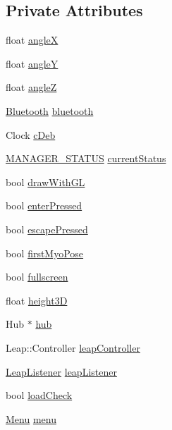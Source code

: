 \subsection*{Private Attributes}
\begin{DoxyCompactItemize}
\item 
float \hyperlink{classManager_ac0797572bb4f1bccef22e3d5d09a7bb5}{angleX}
\item 
float \hyperlink{classManager_a4477aa8adddce16ff4cfb67b4c989ffe}{angleY}
\item 
float \hyperlink{classManager_ae82e575227f9f2fa73492d189fc3f1f0}{angleZ}
\item 
\hyperlink{classBluetooth}{Bluetooth} \hyperlink{classManager_a8ea668a9304bd75db548cb554e1938a0}{bluetooth}
\item 
Clock \hyperlink{classManager_a5a0b1978a70cd9f61dc0992f8d0ff1a7}{c\+Deb}
\item 
\hyperlink{Global_8h_a94049c48a0d77b80bca0fcb5b1281516}{M\+A\+N\+A\+G\+E\+R\+\_\+\+S\+T\+A\+T\+US} \hyperlink{classManager_a85a5040629f23c6cb6d722ff8b82d7d8}{current\+Status}
\item 
bool \hyperlink{classManager_a578fc01b433137173003b232fd5d8b5c}{draw\+With\+GL}
\item 
bool \hyperlink{classManager_a0f72e89b86fbe7d83006e33f3bf65af6}{enter\+Pressed}
\item 
bool \hyperlink{classManager_aa4d6ae86cd8a720763c6a65ec11ee4b2}{escape\+Pressed}
\item 
bool \hyperlink{classManager_a8244d18155248161add39e851a749009}{first\+Myo\+Pose}
\item 
bool \hyperlink{classManager_aa5b7a47a6fbe9ceeb794becfe4b5f783}{fullscreen}
\item 
float \hyperlink{classManager_a993a1557e2721396eec0c996875e7d7a}{height3D}
\item 
Hub $\ast$ \hyperlink{classManager_aa5b648bc7e8a1f5a667b7eaf3aa08152}{hub}
\item 
Leap\+::\+Controller \hyperlink{classManager_a98fbc2dcc62ae1c3f576cb85d5e331f4}{leap\+Controller}
\item 
\hyperlink{classLeapListener}{Leap\+Listener} \hyperlink{classManager_a34352d48738b796043dd3af2a447c5d3}{leap\+Listener}
\item 
bool \hyperlink{classManager_a0b7d7eef1b25676ff98d5cd037aaa9ac}{load\+Check}
\item 
\hyperlink{classMenu}{Menu} \hyperlink{classManager_ae849624e14738867ea9f6fcffef3da24}{menu}
\item 

\end{DoxyCompactItemize}
